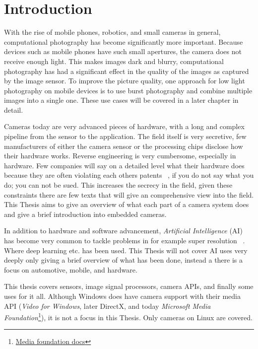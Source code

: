 \chapter{Introduction\label{intro}}
With the rise of mobile phones, robotics, and small cameras in general,
computational photography has become significantly more important. Because
devices such as mobile phones have such small apertures, the camera does not
receive enough light. This makes images dark and blurry, computational
photography has had a significant effect in the quality of the images as
captured by the image sensor. To improve the picture quality, one approach for
low light photography on mobile devices is to use burst photography and combine
multiple images into a single one\cite{burstPhotMobile}. These use cases will
be covered in a later chapter in detail.

Cameras today are very advanced pieces of hardware, with a long and complex
pipeline from the sensor to the application. The field itself is very
secretive, few manufacturers of either the camera sensor or the processing
chips disclose how their hardware works. Reverse engineering is very
cumbersome, especially in hardware. Few companies will say on a detailed level
what their hardware does because they are often violating each others patents~
\cite{experimentalCompPhot}, if you do not say what you do; you can not be
sued. This increases the secrecy in the field, given these constraints there
are few texts that will give an comprehensive view into the field. This Thesis
aims to give an overview of what each part of a camera system does and give a
brief introduction into embedded cameras.

In addition to hardware and software advancement, \textit{Artificial Intelligence} (AI)
has become very common to tackle problems in for example super resolution~
\cite{yangDeepLearningSingle2019, delbracio2021mobile}. Where deep
learning etc. has been used. This Thesis will not cover AI uses very deeply
only giving a brief overview of what has been done, instead a there is a focus
on automotive, mobile, and hardware.

This thesis covers sensors, image signal processors, camera APIs, and finally
some uses for it all. Although Windows does have camera support with their
media API (\textit{Video for Windows}, later DirectX, and today
\textit{Microsoft Media Foundation}\footnote{\href{https://learn.microsoft.com/en-us/windows/win32/medfound/microsoft-media-foundation-sdk}{Media
foundation docs}}), it is not a focus in this Thesis. Only cameras on Linux are
covered.
